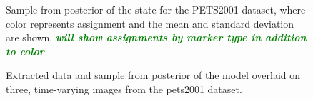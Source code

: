 \documentclass[smallcondensed, final]{svjour3}
\newcommand{\willie}[1]{\textcolor{green}{\textsf{\emph{\textbf{\textcolor{green}{#1}}}}}}
\begin{document}
\begin{figure}
	\centering
	\caption{Sample from posterior of the state for the PETS2001 dataset, where color represents assignment and the mean and standard deviation are shown. \willie{will show assignments by marker type in addition to color}}
	\label{fig:pets2001_results}
\end{figure}



\begin{figure}[h]
        \caption{\label{fig:baselinedata} Extracted data and sample from posterior of the model overlaid on three, time-varying images from the pets2001 dataset.}
\end{figure}
\end{document}
